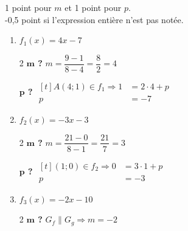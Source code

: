 %
%
    1 point pour $m$ et 1 point pour $p$.\\
    -0,5 point si l'expression entière n'est pas notée.
    \raggedcolumns
    \begin{enumerate}
        \item $f_1(x) = 4x-7$

              \begin{multicols}{2}
                  \textbf{$\bm{m}$ ?}
                  \medbreak
                  $m=\dfrac{9-1}{8-4}=\dfrac{8}{2}=4$

                  \textbf{$\bm{p}$ ?}
                  \medbreak
                  $\begin{aligned}[t]
                          A(4;1)\in f_1 \Rightarrow 1 & = 2\cdot 4 + p \\
                          p                           & = -7
                      \end{aligned}$
              \end{multicols}
        \item $f_2(x) = -3x-3$
              \begin{multicols}{2}
                  \textbf{$\bm{m}$ ?}
                  \medbreak
                  $m=\dfrac{21-0}{8-1}=\dfrac{21}{7}=3$

                  \textbf{$\bm{p}$ ?}
                  \medbreak
                  $\begin{aligned}[t]
                          (1;0)\in f_2 \Rightarrow 0 & = 3\cdot 1 + p \\
                          p                             & = -3
                      \end{aligned}$
              \end{multicols}
        \item $f_3(x) = -2x - 10$
              \begin{multicols}{2}
                  \textbf{$\bm{m}$ ?}
                  \medbreak
                  $G_f \parallel G_g \Rightarrow m = -2$
                  \columnbreak


\end{multicols}
\end{enumerate}
